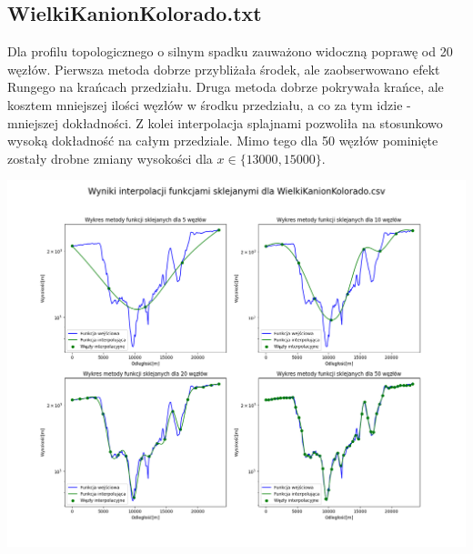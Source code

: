 \documentclass[a4paper,12pt]{article}
\begin{document}
    \newpage
	\subsection{WielkiKanionKolorado.txt}
	Dla profilu topologicznego o silnym spadku zauważono widoczną poprawę od 20 węzłów. Pierwsza metoda dobrze przybliżała środek, ale zaobserwowano efekt Rungego na krańcach przedziału. Druga metoda dobrze pokrywała krańce, ale kosztem mniejszej ilości węzłów w środku przedziału, a co za tym idzie - mniejszej dokładności. Z kolei interpolacja splajnami pozwoliła na stosunkowo wysoką dokładność na całym przedziale. Mimo tego dla 50 węzłów pominięte zostały drobne zmiany wysokości dla $x \in \{13000, 15000\}$.
	\begin{center}
        \includegraphics[scale=0.4]{../charts/cubic_spline_WielkiKanionKolorado.png}
    \end{center}
    
\end{document}
